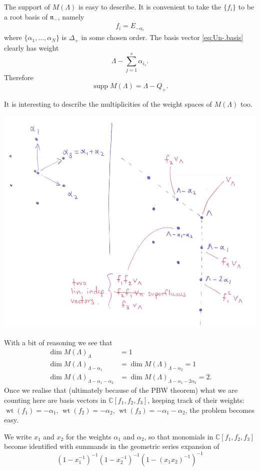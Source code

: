 \documentclass[12pt]{article}
\theoremstyle{plain}
\theoremstyle{definition}
\numberwithin{equation}{section}
\DeclareMathOperator{\supp}{supp}
\DeclareMathOperator{\wt}{wt}
\newcommand{\al}{\alpha}
\newcommand{\La}{\Lambda}
\newcommand{\D}{\Delta}
\newcommand{\C}{\mathbb{C}}
\newcommand{\n}{\mathfrak{n}}
\begin{document}
The support of $M(\La)$ is easy to describe. It is convenient to take the $\{f_i\}$ to be a root basis of $\n_-$, namely
\begin{align*}
f_i = E_{-\al_i}
\end{align*}
where $\{\al_1, \ldots, \al_N\}$ is $\D_+$ in some chosen order. The basis vector \eqref{eq:Un-.basis} clearly has weight
\[
\La - \sum_{j=1}^s \al_{i_s}.
\]
Therefore
\[
\supp M(\La) = \La - Q_+.
\]

It is interesting to describe the multiplicities of the weight spaces of $M(\La)$ too.

\begin{center}
\includegraphics[width=150mm]{Verma-sl3.png}
\end{center}


With a bit of reasoning we see that
\begin{align*}
\dim M(\La)_{\La} &= 1 \\
%
\dim M(\La)_{\La-\al_1} &= \dim M(\La)_{\La-\al_2} = 1 \\
%
\dim M(\La)_{\La-\al_1-\al_2} &= \dim M(\La)_{\La-\al_1-2\al_2} = 2.
\end{align*}
Once we realise that (ultimately because of the PBW theorem) what we are counting here are basis vectors in $\C[f_1, f_2, f_3]$, keeping track of their weights: $\wt(f_1) = -\al_1$, $\wt(f_2) = -\al_2$, $\wt(f_3) = -\al_1-\al_2$, the problem becomes easy.

We write $x_1$ and $x_2$ for the weights $\al_1$ and $\al_2$, so that monomials in $\C[f_1, f_2, f_3]$ become identified with summands in the geometric series expansion of
\[
(1-x_1^{-1})^{-1}(1-x_2^{-1})^{-1}(1-(x_1x_2)^{-1})^{-1}
\]
\end{document}
